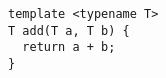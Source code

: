 \documentclass[varwidth=4cm,border={0.1cm 0.1cm 0.1cm 0.1cm}]{standalone}
\begin{document}
\begin{verbatim}
template <typename T>
T add(T a, T b) {
  return a + b;
}
\end{verbatim}
\end{document}
